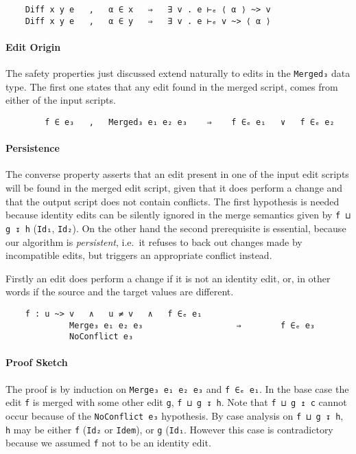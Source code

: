 \documentclass[preprint]{sigplanconf}
\begin{document}
\begin{verbatim}
    Diff x y e   ,   α ∈ x   ⇒   ∃ v . e ⊢ₑ ⟨ α ⟩ ~> v
    Diff x y e   ,   α ∈ y   ⇒   ∃ v . e ⊢ₑ v ~> ⟨ α ⟩
\end{verbatim}
 
    \paragraph{Edit Origin}
    The safety properties just discussed extend naturally to edits in the 
    \texttt{Merged₃} data type.
    The first one states that any edit found in the merged script,
    comes from either of the input scripts.
\begin{verbatim}
        f ∈ e₃   ,   Merged₃ e₁ e₂ e₃    ⇒    f ∈ₑ e₁   ∨   f ∈ₑ e₂
\end{verbatim}
    
    \paragraph{Persistence}
    The converse property asserts that an edit present in one of the input
    edit scripts will be found in the merged edit script, given that it does
    perform a change and that the output script does not contain conflicts.
    The first hypothesis is needed because identity edits can be silently 
    ignored in the merge semantics given by \texttt{f ⊔ g ↧ h} (\texttt{Id₁}, 
    \texttt{Id₂}).
    On the other hand the second prerequisite is essential, because 
    our algorithm is \emph{persistent}, i.e.\ it refuses to back out changes 
    made by incompatible edits, but triggers an appropriate conflict instead.

    Firstly an edit does perform a change if it is not an identity edit, or, in 
    other words if the source and the target values are different.
				
\begin{verbatim}
    f : u ~> v   ∧   u ≠ v   ∧   f ∈ₑ e₁
             Merge₃ e₁ e₂ e₃                   ⇒        f ∈ₑ e₃
             NoConflict e₃ 
\end{verbatim}
    \paragraph{Proof Sketch}
    The proof is by induction on \texttt{Merge₃ e₁ e₂ e₃} and \texttt{f ∈ₑ e₁}.
    In the base case the edit \texttt{f} is merged with some other edit \texttt{g},
    \texttt{f ⊔ g ↧ h}. Note that \texttt{f ⊔ g ↥ c} cannot occur because of
    the \texttt{NoConflict e₃} hypothesis. By case analysis on \texttt{f ⊔ g ↧ h},
    \texttt{h} may be either \texttt{f} (\texttt{Id₂} or \texttt{Idem}), or 
    \texttt{g} (\texttt{Id₁}. However this case is contradictory because we
    assumed \texttt{f} not to be an identity edit.
    
\end{document}
